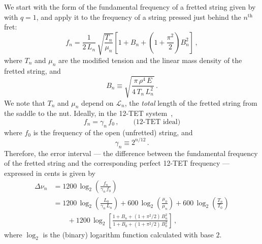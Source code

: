 We start with the form of the fundamental frequency of a fretted string given by  with $q = 1$, and apply it to the frequency of a string pressed just behind the $n^\mathrm{th}$ fret:
 \begin{equation} \label{eqn:f_n_def}
f_n = \frac{1}{2\, L_n}\, \sqrt{\frac{T_n}{\mu_n}} \left[ 1 + B_n + \left(1 + \frac{\pi^2}{2}\right) B_n^2 \right]\, ,
 \end{equation}
where $T_n$ and $\mu_n$ are the modified tension and the linear mass density of the fretted string, and
 \begin{equation} \label{eqn:b_n_def}
B_n \equiv \sqrt{\frac{\pi\, \rho^4\, E}{4\, T_n\, L_n^2}}\, .
 \end{equation}
We note that $T_n$ and $\mu_n$ depend on $\mathcal{L}_n$, the \emph{total} length of the fretted string from the saddle to the nut. Ideally, in the 12-TET system~\cite{ref:durfee2015pms},
 \begin{equation} \label{eqn:f_n_tet}
f_n = \gamma_n\, f_0\, , \qquad \textrm{(12-TET~ideal)}
 \end{equation}
where $f_0$ is the frequency of the open (unfretted) string, and
 \begin{equation} \label{eqn:gamme_n_def}
\gamma_n \equiv 2^{n / 12}\, .
 \end{equation}
Therefore, the error interval --- the difference between the fundamental frequency of the fretted string and the corresponding perfect 12-TET frequency --- expressed in cents is given by
 \begin{equation}\label{eqn:error_def}
 \begin{split}
\Delta \nu_n &= 1200\, \log_2\left( \frac{f_n}{\gamma_n\, f_0} \right) \\
&= 1200\, \log_2 \left( \frac{L_0}{\gamma_n\, L_n} \right) + 600\, \log_2 \left(  \frac{\mu_0}{\mu_n} \right) + 600\, \log_2 \left( \frac{T_n}{T_0} \right) \\
&\qquad + 1200\, \log_2 \left[ \frac{1 + B_n + (1 + \pi^2/2)\, B_n^2}{1 + B_0 + (1 + \pi^2/2)\, B_0^2} \right]\, ,
 \end{split}
 \end{equation}
where $\log_2$ is the (binary) logarithm function calculated with base $2$.

